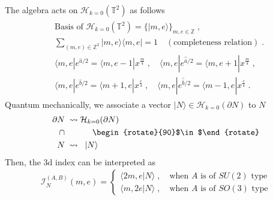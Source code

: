 \documentclass[a4paper,11pt]{article}
\def\cI{\mathcal{I}}
\def\cH{\mathcal{H}}
\begin{document}
%
The algebra acts on $\cH_{k=0}(\mathbb{T}^2)$ as follows \cite{Dimofte:2011py}
%
\begin{align}
\begin{split}
&\textrm{Basis of }\cH_{k=0} (\mathbb{T}^2) = \{ |m,e\rangle \}_{m,e\in \mathbb{Z}}\;,
\\
&\sum_{(m,e) \in \mathbb{Z}^2} |m,e\rangle \langle m,e| = 1 \quad (\textrm{completeness relation})\;.
\\
&\langle m,e | e^{\hat{a}/2} = \langle m, e-1 | x^{\frac{m}4}\;, \quad \langle m,e | e^{\hat{\bar{a}}/2} = \langle m, e+1 | x^{\frac{m}4}\;,
\\
&\langle m, e| e^{\hat{b}/2} = \langle m+1, e| x^{\frac{e}4}\;, \quad \langle m, e| e^{\hat{\bar{b}}/2} = \langle m-1, e| x^{\frac{e}4}\;.  \label{Basis(m,e)}
\end{split}
\end{align}
%
Quantum mechanically, we  associate a vector $|N \rangle \in \cH_{k=0}(\partial N)$ to $N$
%
\begin{align}
\begin{split}
\partial N \; &\rightsquigarrow  \cH_{k=0}(\partial N) 
\\
 \cap \;&  \qquad \quad \text{\begin{rotate}{90}$\in$\end{rotate}}
\\
N  \; &\rightsquigarrow \;\; |N\rangle 
\end{split}
\end{align}
%
Then, the 3d index can be interpreted as
%
\begin{align}
\cI_{N}^{(A,B)}(m,e) =
\begin{cases} \langle 2m,e|N\rangle
\;, \quad \textrm{when $A$ is of $SU(2)$ type}
\\
\langle m, 2e |N \rangle \;, \quad \textrm{when $A$  is of $SO(3)$ type}  \label{3d index as overlap}
\end{cases} 
\end{align}
%
\end{document}
